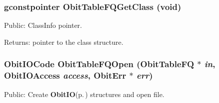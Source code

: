 \subsubsection{\setlength{\rightskip}{0pt plus 5cm}gconstpointer Obit\-Table\-FQGet\-Class (void)}\label{ObitTableFQ_8h_a13}


Public: Class\-Info pointer. 

\begin{Desc}
\item[Returns:]pointer to the class structure. \end{Desc}
\subsubsection{\setlength{\rightskip}{0pt plus 5cm}Obit\-IOCode Obit\-Table\-FQOpen ({\bf Obit\-Table\-FQ} $\ast$ {\em in}, Obit\-IOAccess {\em access}, {\bf Obit\-Err} $\ast$ {\em err})}\label{ObitTableFQ_8h_a17}


Public: Create {\bf Obit\-IO}{\rm (p.\,\pageref{structObitIO})} structures and open file. 


